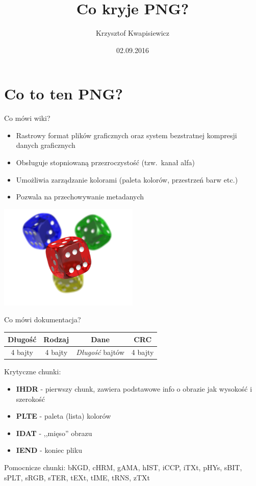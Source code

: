 \documentclass[]{beamer}
\title[Co kryje PNG?]{Co kryje PNG?}
\author[Krzysztof Kwapisiewicz]{Krzysztof Kwapisiewicz}
\institute{Software Engineer @ Codilime}
\date{02.09.2016}
\begin{document}
\begin{frame}
  \begin{titlepage}
  \end{titlepage}
\end{frame}

\section[Co to ten PNG?]{Co to ten PNG?}
\begin{frame}{Co mówi wiki?}
  \begin{itemize}
    \item Rastrowy format plików graficznych oraz system bezstratnej kompresji danych graficznych
    \item Obsługuje stopniowaną przezroczystość (tzw.\ kanał alfa)
    \item Umożliwia zarządzanie kolorami (paleta kolorów, przestrzeń barw etc.)
    \item Pozwala na przechowywanie metadanych
  \end{itemize}
  \begin{center}
    \includegraphics[width=0.5\textwidth]{../img/example.png}
  \end{center}
\end{frame}

\begin{frame}{Co mówi dokumentacja?}
  \begin{center}
    \begin{tabular}{|c|c|c|c|}
      \hline
      \textbf{Długość} & \textbf{Rodzaj} & \textbf{Dane} & \textbf{CRC} \\
      \hline
      4 bajty & 4 bajty & \textit{Długość} bajtów & 4 bajty \\
      \hline
    \end{tabular}
  \end{center}
\end{frame}

\begin{frame}
  Krytyczne chunki:
  \begin{itemize}
    \item \textbf{IHDR} - pierwszy chunk, zawiera podstawowe info o obrazie jak wysokość i szerokość
    \item \textbf{PLTE} - paleta (lista) kolorów
    \item \textbf{IDAT} - ,,mięso'' obrazu
    \item \textbf{IEND} - koniec pliku
  \end{itemize}

  Pomocnicze chunki: bKGD, cHRM, gAMA, hIST, iCCP, iTXt, pHYs, sBIT, sPLT, sRGB, sTER, tEXt, tIME, tRNS, zTXt
\end{frame}
\end{document}
